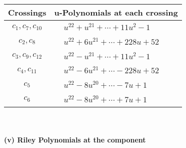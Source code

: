 \documentclass[1p]{elsarticle_modified}
\theoremstyle{definition}
\begin{document}
\begin{tabular}{m{50pt}|m{274pt}}
Crossings & \hspace{64pt}u-Polynomials at each crossing \\
\hline $$\begin{aligned}c_{1},c_{7},c_{10}\end{aligned}$$&$\begin{aligned}
&u^{22}+u^{21}+\cdots+11 u^2-1
\end{aligned}$\\
\hline $$\begin{aligned}c_{2},c_{8}\end{aligned}$$&$\begin{aligned}
&u^{22}+6 u^{21}+\cdots+228 u+52
\end{aligned}$\\
\hline $$\begin{aligned}c_{3},c_{9},c_{12}\end{aligned}$$&$\begin{aligned}
&u^{22}- u^{21}+\cdots+11 u^2-1
\end{aligned}$\\
\hline $$\begin{aligned}c_{4},c_{11}\end{aligned}$$&$\begin{aligned}
&u^{22}-6 u^{21}+\cdots-228 u+52
\end{aligned}$\\
\hline $$\begin{aligned}c_{5}\end{aligned}$$&$\begin{aligned}
&u^{22}-8 u^{20}+\cdots-7 u+1
\end{aligned}$\\
\hline $$\begin{aligned}c_{6}\end{aligned}$$&$\begin{aligned}
&u^{22}-8 u^{20}+\cdots+7 u+1
\end{aligned}$\\
\hline
\end{tabular}\\~\\
\newpage\renewcommand{\arraystretch}{1}
\flushleft \textbf{(v) Riley Polynomials at the component}\newline \\
\end{document}
